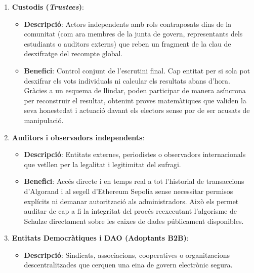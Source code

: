 \begin{enumerate}
\begin{itemize}
        \item \textbf{Benefici}: Reducció dràstica en els costos de gestió que acompanyen qualsevol sufragi tradicional
        (paperetes, urnes físiques, lloguer d'espais, dietes del personal de mesa, serveis de seguretat).
        L'automatització d'aquest procés elimina l'error humà i la necessitat d'escrutinis manuals llargs, oferint
        resultats transparents que reforcen la reputació democràtica de l'entitat.
    \end{itemize}

    \item \textbf{Custodis (\textit{Trustees})}:
    \begin{itemize}
        \item \textbf{Descripció}: Actors independents amb rols contraposats dins de la comunitat (com ara membres de la
        junta de govern, representants dels estudiants o auditors externs) que reben un fragment de la clau de
        desxifratge del recompte global.

        \item \textbf{Benefici}: Control conjunt de l'escrutini final.
        Cap entitat per si sola pot desxifrar els vots individuals ni calcular els resultats abans d'hora.
        Gràcies a un esquema de llindar, poden participar de manera asíncrona per reconstruir el resultat, obtenint
        proves matemàtiques que validen la seva honestedat i actuació davant els electors sense por de ser acusats de
        manipulació.
    \end{itemize}

    \item \textbf{Auditors i observadors independents}:
    \begin{itemize}
        \item \textbf{Descripció}: Entitats externes, periodistes o observadors internacionals que vetllen per la
        legalitat i legitimitat del sufragi.

        \item \textbf{Benefici}: Accés directe i en temps real a tot l'historial de transaccions d'Algorand i al segell
        d'Ethereum Sepolia sense necessitar permisos explícits ni demanar autorització als administradors.
        Això els permet auditar de cap a fi la integritat del procés reexecutant l'algorisme de Schulze directament
        sobre les caixes de dades públicament disponibles.
    \end{itemize}

    \item \textbf{Entitats Democràtiques i DAO (Adoptants B2B)}:
    \begin{itemize}
        \item \textbf{Descripció}: Sindicats, associacions, cooperatives o organitzacions descentralitzades que cerquen
        una eina de govern electrònic segura.


\end{itemize}
\end{enumerate}
